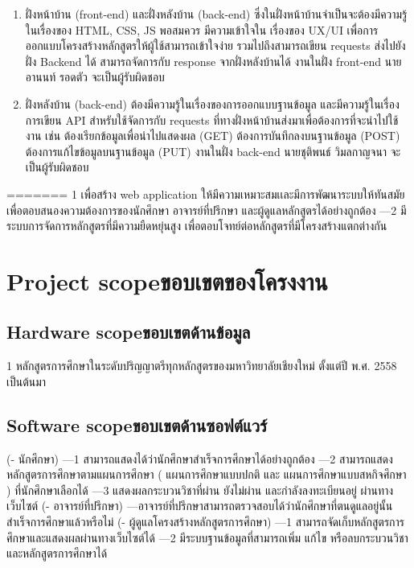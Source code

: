 \begin{enumerate}
    
    \item ฝั่งหน้าบ้าน (front-end) และฝั่งหลังบ้าน (back-end) ซึ่งในฝั่งหน้าบ้านจําเป็นจะต้องมีความรู้ในเรื่องของ HTML, CSS, JS พอสมควร มีความเข้าใจใน เรื่องของ UX/UI เพื่อการออกแบบโครงสร้างหลักสูตรให้ผู้ใช้สามารถเข้าใจง่าย รวมไปถึงสามารถเขียน requests ส่งไปยังฝั่ง Backend ได้ สามารถจัดการกับ response จากฝั่งหลังบ้านได้ งานในฝั่ง front-end นายอานนท์ รอดตัว จะเป็นผู้รับผิดชอบ
    \item ฝั่งหลังบ้าน (back-end) ต้องมีความรู้ในเรื่องของการออกแบบฐานข้อมูล และมีความรู้ในเรื่องการเขียน API สําหรับใช้จัดการกับ requests ที่ทางฝั่งหน้าบ้านส่งมาเพื่อต้องการที่จะนําไปใช้งาน เช่น ต้องเรียกข้อมูลเพื่อนำไปแสดงผล (GET) ต้องการบันทึกลงบนฐานข้อมูล (POST) ต้องการแก้ไขข้อมูลบนฐานข้อมูล (PUT) งานในฝั่ง back-end นายชุติพนธ์ วิมลกาญจนา จะเป็นผู้รับผิดชอบ

\end{enumerate}
=======
{1 เพื่อสร้าง web application ให้มีความเหมาะสมเเละมีการพัฒนาระบบให้ทันสมัย เพื่อตอบสนองความต้องการของนักศึกษา อาจารย์ที่ปรึกษา และผู้ดูแลหลักสูตรได้อย่างถูกต้อง}
{---2 มีระบบการจัดการหลักสูตรที่มีความยืดหยุ่นสูง เพื่อตอบโจทย์ต่อหลักสูตรที่มีโครงสร้างแตกต่างกัน}

\section{\ifenglish Project scope\else ขอบเขตของโครงงาน\fi}

\subsection{\ifenglish Hardware scope\else ขอบเขตด้านข้อมูล\fi}
{1 หลักสูตรการศึกษาในระดับปริญญาตรีทุกหลักสูตรของมหาวิทยาลัยเชียงใหม่ ตั้งแต่ปี พ.ศ. 2558 เป็นต้นมา }
\subsection{\ifenglish Software scope\else ขอบเขตด้านซอฟต์แวร์\fi}
{(- นักศึกษา)}
{---1 สามารถแสดงได้ว่านักศึกษาสำเร็จการศึกษาได้อย่างถูกต้อง}
{---2 สามารถแสดงหลักสูตรการศึกษาตามแผนการศึกษา ( แผนการศึกษาแบบปกติ และ แผนการศึกษาแบบสหกิจศึกษา ) ที่นักศึกษาเลือกได้
}
{---3 แสดงผลกระบวนวิชาที่ผ่าน ยังไม่ผ่าน และกำลังลงทะเบียนอยู่ ผ่านทางเว็บไซต์
}
{(- อาจารย์ที่ปรึกษา)}
{---อาจารย์ที่ปรึกษาสามารถตรวจสอบได้ว่านักศึกษาที่ตนดูแลอยู่นั้นสำเร็จการศึกษาแล้วหรือไม่
}
{(- ผู้ดูแลโครงสร้างหลักสูตรการศึกษา)}
{---1 สามารถจัดเก็บหลักสูตรการศึกษาและแสดงผลผ่านทางเว็บไซต์ได้
}
{---2 มีระบบฐานข้อมูลที่สามารถเพิ่ม แก้ไข หรือลบกระบวนวิชาและหลักสูตรการศึกษาได้
}
